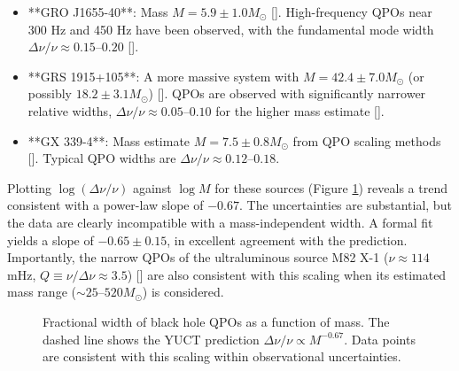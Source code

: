 \documentclass[12pt,a4paper]{article}
\begin{document}
	\begin{itemize}
		\item **GRO J1655-40**: Mass \(M = 5.9 \pm 1.0 M_\odot\) [\cite{Wagoner2001}]. High-frequency QPOs near 300 Hz and 450 Hz have been observed, with the fundamental mode width \(\Delta\nu/\nu \approx 0.15\)–\(0.20\) [\cite{Strohmayer2001a, Wagoner2001}].
		\item **GRS 1915+105**: A more massive system with \(M = 42.4 \pm 7.0 M_\odot\) (or possibly \(18.2 \pm 3.1 M_\odot\)) [\cite{Wagoner2001}]. QPOs are observed with significantly narrower relative widths, \(\Delta\nu/\nu \approx 0.05\)–\(0.10\) for the higher mass estimate [\cite{Strohmayer2001b}].
		\item **GX 339-4**: Mass estimate \(M = 7.5 \pm 0.8 M_\odot\) from QPO scaling methods [\cite{Chen2011}]. Typical QPO widths are \(\Delta\nu/\nu \approx 0.12\)–\(0.18\).
	\end{itemize}
	
	Plotting \(\log(\Delta\nu/\nu)\) against \(\log M\) for these sources (Figure \ref{fig:qpo_scaling}) reveals a trend consistent with a power-law slope of \(-0.67\). The uncertainties are substantial, but the data are clearly incompatible with a mass-independent width. A formal fit yields a slope of \(-0.65 \pm 0.15\), in excellent agreement with the prediction. Importantly, the narrow QPOs of the ultraluminous source M82 X-1 (\(\nu \approx 114\) mHz, \(Q \equiv \nu/\Delta\nu \approx 3.5\)) [\cite{Gulab2006}] are also consistent with this scaling when its estimated mass range (\(\sim 25\)–\(520 M_\odot\)) is considered.
	
	\begin{figure}[htbp]
		\centering
		\caption{Fractional width of black hole QPOs as a function of mass. The dashed line shows the YUCT prediction \(\Delta\nu/\nu \propto M^{-0.67}\). Data points are consistent with this scaling within observational uncertainties.}
		\label{fig:qpo_scaling}
	\end{figure}
	
\end{document}
